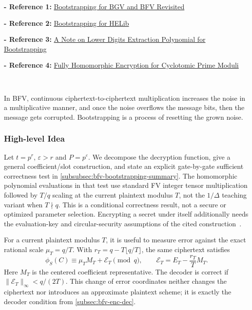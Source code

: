 \noindent \textbf{- Reference 1:} 
\href{https://eprint.iacr.org/2022/1363.pdf}{Bootstrapping for BGV and BFV Revisited}~\cite{cryptoeprint:2022/1363}


\noindent \textbf{- Reference 2:} 
\href{https://eprint.iacr.org/2014/873.pdf}{Bootstrapping for HELib}~\cite{10.1007/s00145-020-09368-7}

\noindent \textbf{- Reference 3:} 
\href{https://arxiv.org/pdf/1906.02867}{A Note on Lower Digits Extraction Polynomial for Bootstrapping}~\cite{huo2019notelowerdigitsextraction}

\noindent \textbf{- Reference 4:} 
\href{https://eprint.iacr.org/2024/1587.pdf}{Fully Homomorphic Encryption for Cyclotomic Prime Moduli}~\cite{cryptoeprint:2024/1587}



$ $

In BFV, continuous ciphertext-to-ciphertext multiplication increases the noise in a multiplicative manner, and once the noise overflows the message bits, then the message gets corrupted. Bootstrapping is a process of resetting the grown noise. 

\subsubsection{High-level Idea}
\label{subsubsec:bfv-bootstrapping-high-level}

Let $t=p^r$, $\varepsilon>r$ and $P=p^\varepsilon$. We decompose the decryption function, give a general coefficient/slot construction, and state an explicit gate-by-gate sufficient correctness test in \autoref{subsubsec:bfv-bootstrapping-summary}. The homomorphic polynomial evaluations in that test use standard FV integer tensor multiplication followed by $T/q$ scaling at the current plaintext modulus $T$, not the $1/\Delta$ teaching variant when $T\nmid q$. This is a conditional correctness result, not a secure or optimized parameter selection. Encrypting a secret under itself additionally needs the evaluation-key and circular-security assumptions of the cited construction~\cite{cryptoeprint:2022/1363}.

For a current plaintext modulus $T$, it is useful to measure error against the exact rational scale $\mu_T=q/T$. With $r_T=q-T\lfloor q/T\rfloor$, the same ciphertext satisfies
\[
\phi_S(C)\equiv\mu_TM_T+\mathcal E_T\pmod q,
\qquad \mathcal E_T=E_T-\frac{r_T}{T}M_T.
\]
Here $M_T$ is the centered coefficient representative. The decoder is correct if $\|\mathcal E_T\|_\infty<q/(2T)$. This change of error coordinates neither changes the ciphertext nor introduces an approximate plaintext scheme; it is exactly the decoder condition from \autoref{subsec:bfv-enc-dec}.

